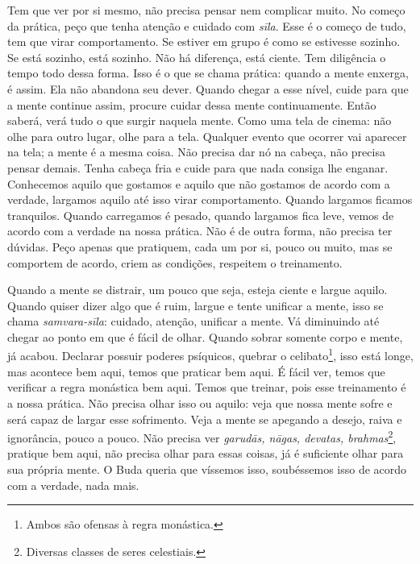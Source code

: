 Tem que ver por si mesmo, não precisa pensar nem complicar muito. No
começo da prática, peço que tenha atenção e cuidado com
\textit{sīla}. Esse é o começo de tudo, tem que virar comportamento.
Se estiver em grupo é como se estivesse sozinho. Se está sozinho, está
sozinho. Não há diferença, está ciente. Tem diligência o tempo todo
dessa forma. Isso é o que se chama prática: quando a mente enxerga, é
assim. Ela não abandona seu dever. Quando chegar a esse nível, cuide
para que a mente continue assim, procure cuidar dessa mente
continuamente. Então saberá, verá tudo o que surgir naquela mente. Como
uma tela de cinema: não olhe para outro lugar, olhe para a tela.
Qualquer evento que ocorrer vai aparecer na tela; a mente é a mesma
coisa. Não precisa dar nó na cabeça, não precisa pensar demais. Tenha
cabeça fria e cuide para que nada consiga lhe enganar. Conhecemos
aquilo que gostamos e aquilo que não gostamos de acordo com a verdade,
largamos aquilo até isso virar comportamento. Quando largamos ficamos
tranquilos. Quando carregamos é pesado, quando largamos fica leve,
vemos de acordo com a verdade na nossa prática. Não é de outra forma,
não precisa ter dúvidas. Peço apenas que pratiquem, cada um por si,
pouco ou muito, mas se comportem de acordo, criem as condições,
respeitem o treinamento. 

Quando a mente se distrair, um pouco que seja, esteja ciente e
largue aquilo. Quando quiser dizer algo que é ruim, largue e tente
unificar a mente, isso se chama \textit{samvara-sīla}:\textit{
}cuidado, atenção, unificar a mente. Vá diminuindo até chegar ao ponto
em que é fácil de olhar. Quando sobrar somente corpo e mente, já
acabou. Declarar possuir poderes psíquicos, quebrar o
celibato\footnote{Ambos são ofensas à regra monástica.}, isso está
longe, mas acontece bem aqui, temos que praticar bem aqui. É fácil ver,
temos que verificar a regra monástica bem aqui. Temos que treinar, pois
esse treinamento é a nossa prática. Não precisa olhar isso ou aquilo:
veja que nossa mente sofre e será capaz de largar esse sofrimento. Veja
a mente se apegando a desejo, raiva e ignorância, pouco a pouco. Não
precisa ver \textit{garud\=as, n\=agas, devatas,
brahmas}\footnote{Diversas classes de seres celestiais.}, pratique bem
aqui, não precisa olhar para essas coisas, já é suficiente olhar para
sua própria mente. O Buda queria que víssemos isso, soubéssemos isso de
acordo com a verdade, nada mais.

